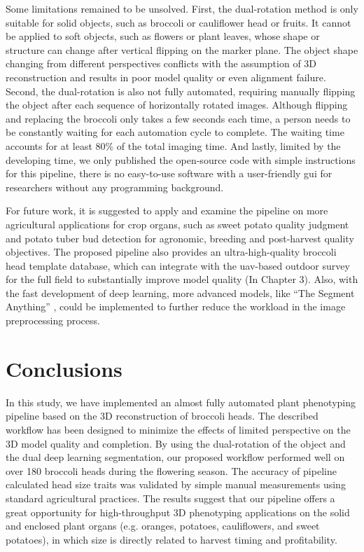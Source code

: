Some limitations remained to be unsolved. First, the dual-rotation method is only suitable for solid objects, such as broccoli or cauliflower head or fruits. It cannot be applied to soft objects, such as flowers or plant leaves, whose shape or structure can change after vertical flipping on the marker plane. The object shape changing from different perspectives conflicts with the assumption of 3D reconstruction and results in poor model quality or even alignment failure. Second, the dual-rotation is also not fully automated, requiring manually flipping the object after each sequence of horizontally rotated images. Although flipping and replacing the broccoli only takes a few seconds each time, a person needs to be constantly waiting for each automation cycle to complete. The waiting time accounts for at least 80\% of the total imaging time. And lastly, limited by the developing time, we only published the open-source code with simple instructions for this pipeline, there is no easy-to-use software with a user-friendly \gls{gui} for researchers without any programming background.

For future work, it is suggested to apply and examine the pipeline on more agricultural applications for crop organs, such as sweet potato quality judgment and potato tuber bud detection for agronomic, breeding and post-harvest quality objectives. The proposed pipeline also provides an ultra-high-quality broccoli head template database, which can integrate with the \gls{uav}-based outdoor survey for the full field to substantially improve model quality (In Chapter 3). Also, with the fast development of deep learning, more advanced models, like ``The Segment Anything'' \citep{kirillov_segany_2023}, could be implemented to further reduce the workload in the image preprocessing process.

\section{Conclusions}

In this study, we have implemented an almost fully automated plant phenotyping pipeline based on the 3D reconstruction of broccoli heads. The described workflow has been designed to minimize the effects of limited perspective on the 3D model quality and completion. By using the dual-rotation of the object and the dual deep learning segmentation, our proposed workflow performed well on over 180 broccoli heads during the flowering season. The accuracy of pipeline calculated head size traits was validated by simple manual measurements using standard agricultural practices. The results suggest that our pipeline offers a great opportunity for high-throughput 3D phenotyping applications on the solid and enclosed plant organs (e.g. oranges, potatoes, cauliflowers, and sweet potatoes), in which size is directly related to harvest timing and profitability.